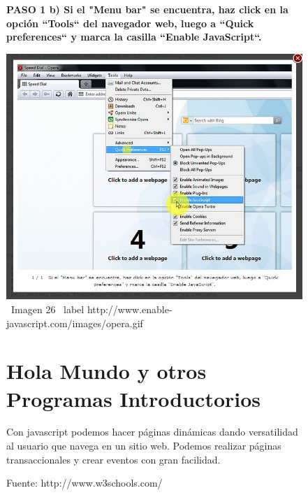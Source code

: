 \documentclass[11pt]{article} %
\begin{document}
\begin{figure}
\begin{center}

\begin{center}
\bf PASO 1
 b) Si el "Menu bar" se encuentra, haz click en la opción ``Tools`` del navegador web, luego a ``Quick preferences`` y marca la casilla ``Enable JavaScript``.
\end{center}

\includegraphics[height=8 cm, width=8 cm] {imagenes/opera 02.jpg}
\newline
\newline
\ Imagen 26
\ label {http://www.enable-javascript.com/images/opera.gif}



\section{Hola Mundo y otros Programas Introductorios} 

Con javascript podemos hacer páginas dinámicas dando versatilidad al usuario que navega en un sitio web. Podemos realizar páginas transaccionales y crear eventos con gran facilidad.


\caption { Fuente: http://www.w3schools.com/ }





\end{center}
\end{figure}


\lstset{language=Pascal}          %
\end{document}
